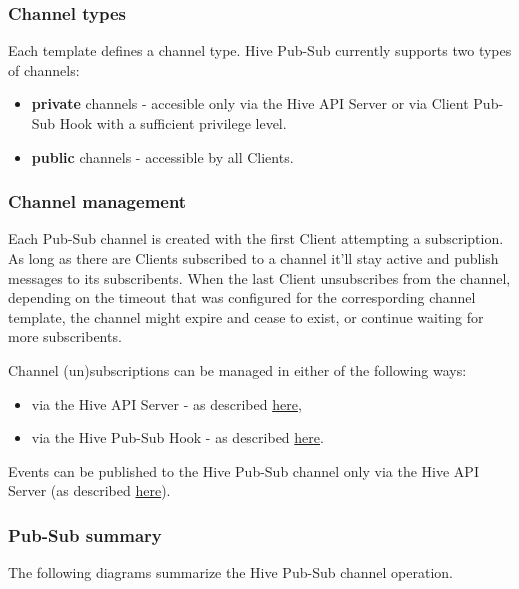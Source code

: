 \documentclass[a4paper]{article}
\begin{document}
\subsubsection{Channel types}
\label{sec-7-3-2}

Each template defines a channel type. Hive Pub-Sub currently supports two types of channels:


\begin{itemize}
\item \textbf{private} channels - accesible only via the Hive API Server or via Client Pub-Sub Hook with a sufficient privilege level.
\item \textbf{public} channels - accessible by all Clients.
\end{itemize}
\subsubsection{Channel management}
\label{sec-7-3-3}

Each Pub-Sub channel is created with the first Client attempting a subscription. As long as there are Clients subscribed to a channel it'll stay active and publish messages to its subscribents. When the last Client unsubscribes from the channel, depending on the timeout that was configured for the correspording channel template, the channel might expire and cease to exist, or continue waiting for more subscribents.

\noindent
Channel (un)subscriptions can be managed in either of the following ways:


\begin{itemize}
\item via the Hive API Server - as described \hyperref[sec-6-1-7]{here},
\item via the Hive Pub-Sub Hook - as described \hyperref[sec-9-2-4]{here}.
\end{itemize}

\noindent
Events can be published to the Hive Pub-Sub channel only via the Hive API Server (as described \hyperref[sec-6-1-7]{here}).
\subsubsection{Pub-Sub summary}
\label{sec-7-3-4}

The following diagrams summarize the Hive Pub-Sub channel operation.
\end{document}
